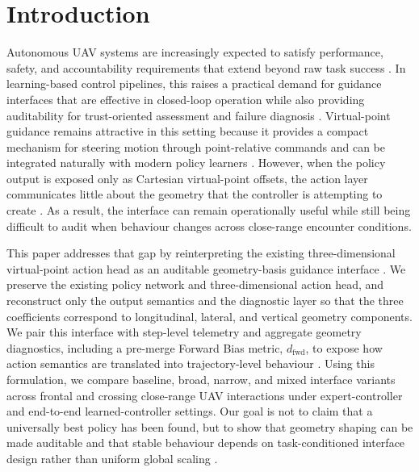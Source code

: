 \documentclass[drones,article,submit,pdftex,moreauthors]{Definitions/mdpi}
\begin{document}
\section{Introduction}

Autonomous UAV systems are increasingly expected to satisfy performance, safety, and accountability requirements that extend beyond raw task success \cite{elmokadem2021,paterson2025,gunning2019}. In learning-based control pipelines, this raises a practical demand for guidance interfaces that are effective in closed-loop operation while also providing auditability for trust-oriented assessment and failure diagnosis \cite{glanois2024,paterson2025,thomas2021}. Virtual-point guidance remains attractive in this setting because it provides a compact mechanism for steering motion through point-relative commands and can be integrated naturally with modern policy learners \cite{zarchan2012}. However, when the policy output is exposed only as Cartesian virtual-point offsets, the action layer communicates little about the geometry that the controller is attempting to create \cite{lai2026aerospace}. As a result, the interface can remain operationally useful while still being difficult to audit when behaviour changes across close-range encounter conditions.

This paper addresses that gap by reinterpreting the existing three-dimensional virtual-point action head as an auditable geometry-basis guidance interface \cite{xu2022ast}. We preserve the existing policy network and three-dimensional action head, and reconstruct only the output semantics and the diagnostic layer so that the three coefficients correspond to longitudinal, lateral, and vertical geometry components. We pair this interface with step-level telemetry and aggregate geometry diagnostics, including a pre-merge Forward Bias metric, $d_{\mathrm{fwd}}$, to expose how action semantics are translated into trajectory-level behaviour \cite{lai2026aerospace}. Using this formulation, we compare baseline, broad, narrow, and mixed interface variants across frontal and crossing close-range UAV interactions under expert-controller and end-to-end learned-controller settings. Our goal is not to claim that a universally best policy has been found, but to show that geometry shaping can be made auditable and that stable behaviour depends on task-conditioned interface design rather than uniform global scaling \cite{wang2023aerospace}.
\end{document}
